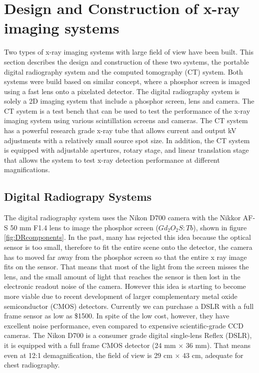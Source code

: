 \chapter{Design and Construction of x-ray imaging systems}
\label{chap:design_construction}

Two types of x-ray imaging systems with large field of view have been built.  This section describes the design and construction of these two systems, the portable digital radiography system and the computed tomography (CT) system.  Both systems were build based on similar concept, where a phosphor screen is imaged using a fast lens onto a pixelated detector.  The digital radiography system is solely a 2D imaging system that include a phosphor screen, lens and camera.  The CT system is a test bench that can be used to test the performance of the x-ray imaging system using various scintillation screens and cameras.  The CT system has a powerful research grade x-ray tube that allows current and output kV adjustments with a relatively small source spot size.  In addition, the CT system is equipped with adjustable apertures, rotary stage, and linear translation stage that allows the system to test x-ray detection performance at different magnifications.

\section{Digital Radiograpy Systems}
The digital radiography system uses the Nikon D700 camera with the Nikkor AF-S 50 mm F1.4 lens to image the phosphor screen ($Gd_2O_2S:Tb$), shown in figure \ref{fig:DRcomponents}.  In the past, many has rejected this idea because the optical sensor is too small, therefore to fit the entire scene onto the detector, the camera has to moved far away from the phosphor screen so that the entire x ray image fits on the sensor.  That means that most of the light from the screen misses the lens, and the small amount of light that reaches the sensor is then lost in the electronic readout noise of the camera.  However this idea is starting to become more viable due to recent development of larger complementary metal oxide semiconductor (CMOS) detectors.  Currently we can purchase a DSLR with a full frame sensor as low as \$1500.  In spite of the low cost, however, they have excellent noise performance, even compared to expensive scientific-grade CCD cameras.  The Nikon D700 is a consumer grade digital single-lens Reflex (DSLR), it is equipped with a full frame CMOS detector (24 mm $\times$ 36 mm).  That means even at 12:1 demagnification, the field of view is 29 cm $\times$ 43 cm, adequate for chest radiography.  

